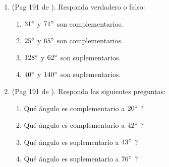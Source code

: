 \begin{enumerate}
	\item (Pag 191 de \cite{Dimensions_Math_7A}). Responda verdadero o falso:
	\begin{enumerate}[label=\Alph*) ]
		\item $31\degree$ y $71\degree$	son complementarios.
		\item $25\degree$ y $65\degree$	son complementarios.
		\item $128\degree$ y $62\degree$ son suplementarios.
		\item $40\degree$ y $140\degree$ son suplementarios.						
	\end{enumerate}
	
	\item (Pag 191 de \cite{Dimensions_Math_7A}). Responda las siguientes preguntas:
	\begin{enumerate}[label=\Alph*) ]
		\item Qué ángulo es complementario a $20\degree$ ?
		\item Qué ángulo es complementario a $42\degree$ ?
		\item Qué ángulo es suplementario a $43\degree$ ?
		\item Qué ángulo es suplementario a $76\degree$ ?
	\end{enumerate}	
	

\end{enumerate}
